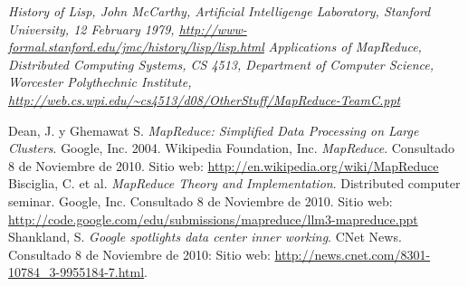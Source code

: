 \documentclass[spanish]{article}
\begin{document}
\begin{thebibliography}{99}
 \textit{History of Lisp, John McCarthy, Artificial Intelligenge Laboratory, Stanford University, 12 February 1979, \url{http://www-formal.stanford.edu/jmc/history/lisp/lisp.html} }
 \textit{Applications of MapReduce, Distributed Computing Systems, CS 4513, Department of Computer Science, Worcester Polythechnic Institute, \url{http://web.cs.wpi.edu/~cs4513/d08/OtherStuff/MapReduce-TeamC.ppt}}



 Dean, J. y Ghemawat S. \textit{MapReduce: Simplified Data Processing on Large Clusters}. Google, Inc. 2004.
 Wikipedia Foundation, Inc. \textit{MapReduce}. Consultado 8 de Noviembre de 2010. Sitio web: \url{http://en.wikipedia.org/wiki/MapReduce}
 Bisciglia, C. et al. \textit{MapReduce Theory and Implementation}. Distributed computer seminar. Google, Inc. Consultado 8 de Noviembre de 2010. Sitio web: \url{http://code.google.com/edu/submissions/mapreduce/llm3-mapreduce.ppt} 
 Shankland, S. \textit{Google spotlights data center inner working}. CNet News. Consultado 8 de Noviembre de 2010: Sitio web: \url{http://news.cnet.com/8301-10784_3-9955184-7.html}. 


\end{thebibliography}
\end{document}
